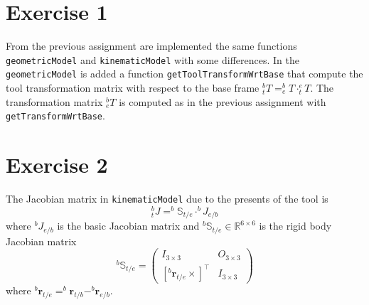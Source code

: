 \section{Exercise 1} \label{P1}

From the previous assignment are implemented the same functions \verb*|geometricModel| and \verb*|kinematicModel| with some differences.
In the \verb*|geometricModel| is added a function \verb*|getToolTransformWrtBase| that compute the tool transformation matrix with respect to the base frame $^b_t T = ^b_e T \cdot ^e_t T$. The transformation matrix $^b_e T$ is computed as in the previous assignment with \verb*|getTransformWrtBase|.

\section{Exercise 2}
The Jacobian matrix in \verb*|kinematicModel| due to the presents of the tool is 
\begin{equation} \label{E1}
	^b_t J = ^b \mathbb{S}_{t/e} \cdot ^b J_{e/b}
\end{equation}
where $^b J_{e/b}$ is the basic Jacobian matrix and $^b \mathbb{S}_{t/e} \in \mathbb{R}^{6\times6}$ is the rigid body Jacobian matrix 
\begin{equation*}
	^b \mathbb{S}_{t/e} = \begin{pmatrix}
		I_{3\times 3} & O_{3\times 3}  \\
		[^b \mathbf{r}_{t/e}\times]^\top & I_{3\times 3}
	\end{pmatrix}
\end{equation*}
where $^b \mathbf{r}_{t/e} = ^b \mathbf{r}_{t/b} - ^b \mathbf{r}_{e/b}$.

